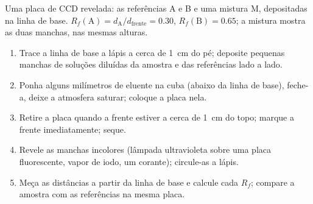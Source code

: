 \begin{omfigure}

{\small Uma placa de CCD revelada: as referências A e B e uma mistura M,
depositadas na linha de base. $R_f(\mathrm{A}) = d_{\mathrm{A}}/d_{\mathrm{frente}}
= 0.30$, $R_f(\mathrm{B}) = 0.65$; a mistura mostra as duas manchas, nas
mesmas alturas.}
\end{omfigure}

\begin{method}\label{met:b1:lab-techniques-1:tlc}
\begin{enumerate}
  \item Trace a linha de base a lápis a cerca de \qty{1}{cm} do pé; deposite
        pequenas manchas de soluções diluídas da amostra e das referências
        lado a lado.
  \item Ponha alguns milímetros de eluente na cuba (abaixo da linha de
        base), feche-a, deixe a atmosfera saturar; coloque a placa nela.
  \item Retire a placa quando a frente estiver a cerca de \qty{1}{cm} do
        topo; marque a frente imediatamente; seque.
  \item Revele as manchas incolores (lâmpada ultravioleta sobre uma placa
        fluorescente, vapor de iodo, um corante); circule-as a lápis.
  \item Meça as distâncias a partir da linha de base e calcule cada $R_f$;
        compare a amostra com as referências na mesma placa.
\end{enumerate}
\end{method}

